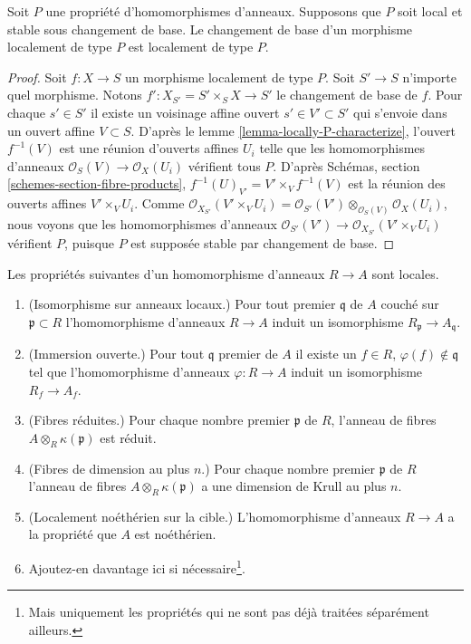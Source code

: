 \begin{lemma}
\label{lemma-base-change-type-P}
Soit $P$ une propriété d'homomorphismes d'anneaux.
Supposons que $P$ soit local et stable sous changement de base.
Le changement de base d'un morphisme localement de type $P$ est
localement de type $P$.
\end{lemma}

\begin{proof}
Soit $f : X \to S$ un morphisme localement de type $P$.
Soit $S' \to S$ n'importe quel
morphisme. Notons $f' : X_{S'} = S' \times_S X \to S'$ le changement de base de
$f$. Pour chaque $s' \in S'$ il existe un voisinage affine
ouvert $s' \in V' \subset S'$ qui s'envoie dans un ouvert affine $V \subset S$.
D'après le lemme \ref{lemma-locally-P-characterize}, l'ouvert $f^{-1}(V)$ est une
réunion d'ouverts affines $U_i$ telle que les homomorphismes d'anneaux
$\mathcal{O}_S(V) \to \mathcal{O}_X(U_i)$ vérifient tous $P$.
D'après Schémas, section \ref{schemes-section-fibre-products},
$f^{-1}(U)_{V'} = V' \times_V f^{-1}(V)$ est la réunion
des ouverts affines $V' \times_V U_i$.
Comme $\mathcal{O}_{X_{S'}}(V' \times_V U_i) =
\mathcal{O}_{S'}(V') \otimes_{\mathcal{O}_S(V)} \mathcal{O}_X(U_i)$,
nous voyons que les homomorphismes d'anneaux
$\mathcal{O}_{S'}(V') \to \mathcal{O}_{X_{S'}}(V' \times_V U_i)$
vérifient $P$, puisque $P$ est supposée stable par changement de base.
\end{proof}

\begin{lemma}
\label{lemma-properties-local}
Les propriétés suivantes d'un homomorphisme d'anneaux $R \to A$ sont locales.
\begin{enumerate}
\item (Isomorphisme sur anneaux locaux.)
Pour tout premier $\mathfrak q$ de $A$ couché sur $\mathfrak p \subset R$
l'homomorphisme d'anneaux $R \to A$
induit un isomorphisme $R_{\mathfrak p} \to A_{\mathfrak q}$.
\item (Immersion ouverte.)
Pour tout $\mathfrak q$ premier de $A$ il existe un
$f \in R$, $\varphi(f) \not \in \mathfrak q$ tel que l'homomorphisme d'anneaux $\varphi : R \to A$ induit
un isomorphisme $R_f \to A_f$.
\item (Fibres réduites.)
Pour chaque nombre premier $\mathfrak p$ de $R$,
l'anneau de fibres $A \otimes_R \kappa(\mathfrak p)$ est réduit.
\item (Fibres de dimension au plus $n$.)
Pour chaque nombre premier $\mathfrak p$ de $R$ l'anneau
de fibres $A \otimes_R \kappa(\mathfrak p)$ a une dimension de Krull au plus $n$.
\item (Localement noéthérien sur la cible.) L'homomorphisme
d'anneaux $R \to A$ a la propriété que $A$ est noéthérien.
\item Ajoutez-en davantage ici si nécessaire\footnote{Mais uniquement les propriétés
qui ne sont pas déjà traitées séparément ailleurs.}.
\end{enumerate}
\end{lemma}

